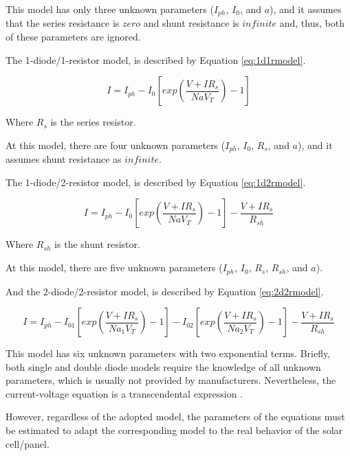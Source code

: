 This model has only three unknown parameters ($ I_{ph}$, $I_{0}$, and $a $), and it assumes that the series resistance is $ zero $ and shunt resistance is $ infinite $ and, thus, both of these parameters are ignored.
 
The 1-diode/1-resistor model, is described by Equation \ref{eq:1d1rmodel}. 

\begin{equation}
\label{eq:1d1rmodel}
I =I_{ph}-I_{0}\left[ exp \left( \dfrac{V+IR_{s}}{NaV_{T}} \right) -1 \right] 
\end{equation}

Where $R_{s}$ is the series resistor.

At this model, there are four unknown parameters ($ I_{ph}$, $I_{0}$, $ R_{s} $, and $ a $), and it assumes shunt resistance as $ infinite $.

The 1-diode/2-resistor model, is described by Equation \ref{eq:1d2rmodel}. 

\begin{equation}
\label{eq:1d2rmodel}
I =I_{ph}-I_{0}\left[ exp \left( \dfrac{V+IR_{s}}{NaV_{T}} \right) -1 \right] - \dfrac{V+IR_{s}}{R_{sh}}
\end{equation}

Where $R_{sh}$ is the shunt resistor.

At this model, there are five unknown parameters ($ I_{ph}$, $I_{0}$, $ R_{s} $, $ R_{sh} $, and $ a $).

And the 2-diode/2-resistor model, is described by Equation \ref{eq:2d2rmodel}. 

\begin{equation}
\label{eq:2d2rmodel}
I =I_{ph}-I_{01}\left[ exp \left( \dfrac{V+IR_{s}}{Na_{1}V_{T}} \right) -1 \right] - I_{02}\left[ exp \left( \dfrac{V+IR_{s}}{Na_{2}V_{T}} \right) -1 \right] - \dfrac{V+IR_{s}}{R_{sh}}
\end{equation}

This model has six unknown parameters with two exponential terms. 
Briefly, both single and double diode models require the knowledge of all unknown parameters, which is usually not provided by manufacturers. Nevertheless, the current-voltage equation is a transcendental expression \cite{Jakhrani}.  

However, regardless of the adopted model, the parameters of the equations must be estimated to adapt the corresponding model to the real behavior of the solar cell/panel. 


